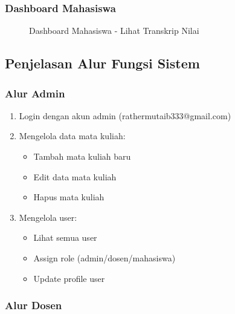 \documentclass[12pt,a4paper]{article}
\begin{document}
\subsubsection{Dashboard Mahasiswa}

\begin{figure}[H]
\centering
{}
\caption{Dashboard Mahasiswa - Lihat Transkrip Nilai}
\end{figure}

\subsection{Penjelasan Alur Fungsi Sistem}

\subsubsection{Alur Admin}

\begin{enumerate}
    \item Login dengan akun admin (rathermutaib333@gmail.com)
    \item Mengelola data mata kuliah:
    \begin{itemize}
        \item Tambah mata kuliah baru
        \item Edit data mata kuliah
        \item Hapus mata kuliah
    \end{itemize}
    \item Mengelola user:
    \begin{itemize}
        \item Lihat semua user
        \item Assign role (admin/dosen/mahasiswa)
        \item Update profile user
    \end{itemize}
\end{enumerate}

\subsubsection{Alur Dosen}
\end{document}
